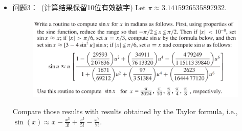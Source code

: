 \documentclass[10pt,a4paper,oneside]{article}
\begin{document}
\begin{itemize}
\item{问题3：~(计算结果保留10位有效数字)}  Let $\pi \approx 3.14159 26535 897932.$ 
\vspace{-0.1in}
\begin{figure}[htb]%
	\centering
    \includegraphics[width=5.40in]{lab01c(1).png}
\end{figure}

\vspace{-0.2in}
Compare those results with results obtained by the Taylor formula, i.e., $\sin(x) \approx x- \frac{x^3}{3!} +  \frac{x^5}{5!} - \frac{x^7}{7!}$.
\end{itemize}

\clearpage
\end{document}
